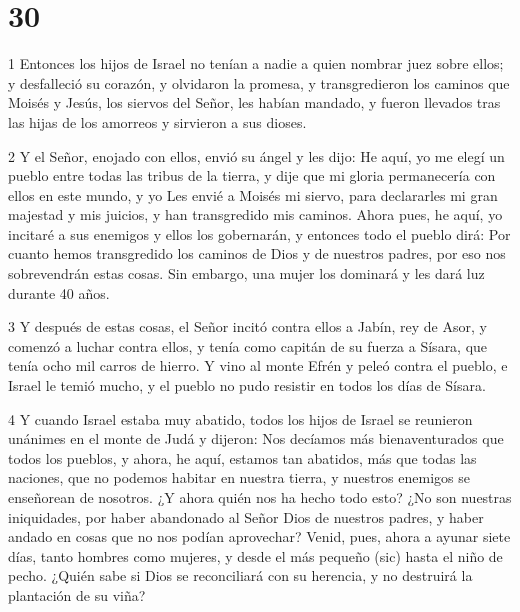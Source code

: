 \chapter{30}

\par 1 Entonces los hijos de Israel no tenían a nadie a quien nombrar juez sobre ellos; y desfalleció su corazón, y olvidaron la promesa, y transgredieron los caminos que Moisés y Jesús, los siervos del Señor, les habían mandado, y fueron llevados tras las hijas de los amorreos y sirvieron a sus dioses.

\par 2 Y el Señor, enojado con ellos, envió su ángel y les dijo: He aquí, yo me elegí un pueblo entre todas las tribus de la tierra, y dije que mi gloria permanecería con ellos en este mundo, y yo Les envié a Moisés mi siervo, para declararles mi gran majestad y mis juicios, y han transgredido mis caminos. Ahora pues, he aquí, yo incitaré a sus enemigos y ellos los gobernarán, y entonces todo el pueblo dirá: Por cuanto hemos transgredido los caminos de Dios y de nuestros padres, por eso nos sobrevendrán estas cosas. Sin embargo, una mujer los dominará y les dará luz durante 40 años.

\par 3 Y después de estas cosas, el Señor incitó contra ellos a Jabín, rey de Asor, y comenzó a luchar contra ellos, y tenía como capitán de su fuerza a Sísara, que tenía ocho mil carros de hierro. Y vino al monte Efrén y peleó contra el pueblo, e Israel le temió mucho, y el pueblo no pudo resistir en todos los días de Sísara.

\par 4 Y cuando Israel estaba muy abatido, todos los hijos de Israel se reunieron unánimes en el monte de Judá y dijeron: Nos decíamos más bienaventurados que todos los pueblos, y ahora, he aquí, estamos tan abatidos, más que todas las naciones, que no podemos habitar en nuestra tierra, y nuestros enemigos se enseñorean de nosotros. ¿Y ahora quién nos ha hecho todo esto? ¿No son nuestras iniquidades, por haber abandonado al Señor Dios de nuestros padres, y haber andado en cosas que no nos podían aprovechar? Venid, pues, ahora a ayunar siete días, tanto hombres como mujeres, y desde el más pequeño (sic) hasta el niño de pecho. ¿Quién sabe si Dios se reconciliará con su herencia, y no destruirá la plantación de su viña?

